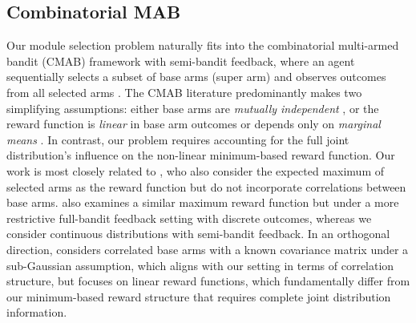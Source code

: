 \documentclass[opre,sglanonrev]{informs4}
\begin{document}
\subsection{Combinatorial MAB} 
Our module selection problem naturally fits into the combinatorial multi-armed bandit (CMAB) framework with semi-bandit feedback, where an agent sequentially selects a subset of base arms (super arm) and observes outcomes from all selected arms \citep{pmlr-v28-chen13a}. The CMAB literature predominantly makes two simplifying assumptions: either base arms are \emph{mutually independent} \citep{10.5555/3737916.3740755, Combes2015CombinatorialBR, 10.1145/3410220.3453926}, or the reward function is \emph{linear} in base arm outcomes or depends only on \emph{marginal means} \citep{Demirel2021CombinatorialGP, Kveton2015CombinatorialCB}. In contrast, our problem requires accounting for the full joint distribution's influence on the non-linear minimum-based reward function. Our work is most closely related to \citep{Chen2016CombinatorialMB}, who also consider the expected maximum of selected arms as the reward function but do not incorporate correlations between base arms. \citep{Wang2023CombinatorialBF} also examines a similar maximum reward function but under a more restrictive full-bandit feedback setting with discrete outcomes, whereas we consider continuous distributions with semi-bandit feedback. In an orthogonal direction, \citep{Degenne2016CombinatorialSW} considers correlated base arms with a known covariance matrix under a sub-Gaussian assumption, which aligns with our setting in terms of correlation structure, but focuses on linear reward functions, which fundamentally differ from our minimum-based reward structure that requires complete joint distribution information.
\end{document}
